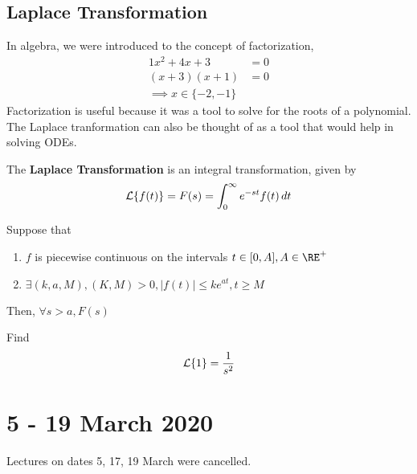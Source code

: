 \documentclass[diffeq.tex]{subfiles}
\begin{document}
    \section{Laplace Transformation}
    In algebra, we were introduced to the concept of factorization,
    \begin{alignat}{1}
        x^{2} + 4x + 3 &= 0 \\
        (x + 3)(x + 1) &= 0 \\
        \implies x \in \{-2, -1\}
    \end{alignat}
    Factorization is useful because it was a tool to solve for the roots of a polynomial. The Laplace tranformation can also be thought of as a tool that would help in solving ODEs.

    \begin{definition}
        The \textbf{Laplace Transformation} is an integral transformation, given by
        \begin{equation}
            \mathcal{L}\{f(t)\} = F(s) = \int_{0}^{\infty}e^{-st}f(t)\,dt
        \end{equation}
    \end{definition}

    \begin{btheorem} %
        Suppose that
        \begin{enumerate}
            \item $f$ is piecewise continuous on the intervals $t\in[0,A], A \in \RE^{+}$
            \item $\exists (k, a, M), (K, M) > 0, |f(t)| \leq ke^{at}, t \geq M$
        \end{enumerate}
        Then, $\forall s > a, F(s)$
    \end{btheorem}
    \np
    \begin{example} %
        Find \begin{equation}
            \mathcal{L}\{1\} = \frac{1}{s^{2}}
        \end{equation}
    \end{example}
    \chapter*{5 - 19 March 2020}
    Lectures on dates 5, 17, 19 March were cancelled.
\end{document}
